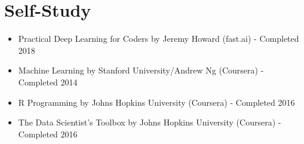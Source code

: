 \documentclass[letterpaper]{twentysecondcv} %
\begin{document}

\section{Self-Study}
\begin{itemize} \itemsep -2pt %
        \item Practical Deep Learning for Coders by Jeremy Howard (fast.ai) - {\footnotesize{Completed 2018}}
        \item Machine Learning by Stanford University/Andrew Ng (Coursera) - {\footnotesize{Completed 2014}}
       	\item R Programming by Johns Hopkins University (Coursera) - {\footnotesize{Completed 2016}}
        \item The Data Scientist's Toolbox by Johns Hopkins University (Coursera) - {\footnotesize{Completed 2016}}
\end{itemize}
\end{document}

